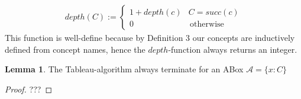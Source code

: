\documentclass[a4paper,11pt]{scrartcl}
\theoremstyle{break}
\theoremstyle{definition}
\newtheorem{mylem}{Lemma}
\begin{document}
\begin{align*}
depth(C):=\begin{cases}
1+depth(c) & C=succ(c) \\
0 & \, \text{otherwise}
\end{cases}
\end{align*}
This function is well-define because by Definition 3 our concepts are inductively defined from concept names, hence the $depth$-function always returns an integer.
\begin{mylem}
The Tableau-algorithm always terminate for an ABox $\mathcal{A}=\{x:C\}$
\end{mylem}
\begin{proof}
???
\end{proof}
\normalem


\end{document}
